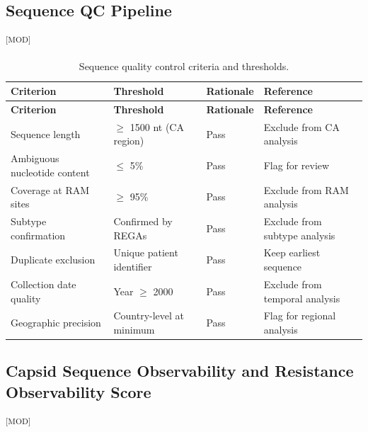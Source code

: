 \documentclass[12pt]{article}
\newcommand{\GradeModerate}{\textsuperscript{\textsf{[MOD]}}}
\begin{document}
\subsection{Sequence QC Pipeline}\label{sec:qc_pipeline}\GradeModerate



\begin{longtable}{p{3cm}p{4cm}p{4cm}p{4cm}}
    \caption{Sequence quality control criteria and thresholds.}\label{tab:qc_criteria}\\
    \toprule
    \textbf{Criterion} & \textbf{Threshold} & \textbf{Rationale} & \textbf{Reference} \\
    \midrule
    \endfirsthead
    \toprule
    \textbf{Criterion} & \textbf{Threshold} & \textbf{Rationale} & \textbf{Reference} \\
    \midrule
    \endhead
    \bottomrule
    \endfoot
    Sequence length & $\geq$ 1500 nt (CA region) & Pass & Exclude from CA analysis \\
    Ambiguous nucleotide content & $\leq$ 5\% & Pass & Flag for review \\
    Coverage at RAM sites & $\geq$ 95\% & Pass & Exclude from RAM analysis \\
    Subtype confirmation & Confirmed by REGAs & Pass & Exclude from subtype analysis \\
    Duplicate exclusion & Unique patient identifier & Pass & Keep earliest sequence \\
    Collection date quality & Year $\geq$ 2000 & Pass & Exclude from temporal analysis \\
    Geographic precision & Country-level at minimum & Pass & Flag for regional analysis \\
    \bottomrule
\end{longtable}

\subsection{Capsid Sequence Observability and Resistance Observability Score}\label{sec:cso_ros}\GradeModerate


\end{document}
